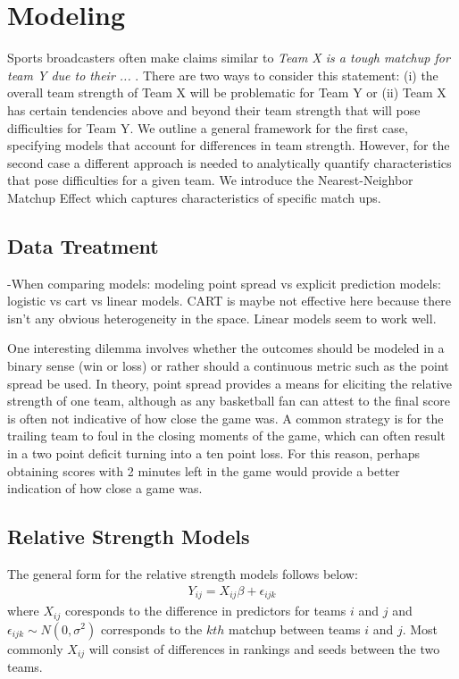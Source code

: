 \section{Modeling}
Sports broadcasters often make claims similar to \emph{Team X is a tough matchup for team Y due to their ... }.  There are two ways to consider this statement: (i) the overall team strength of Team X will be problematic for Team Y or (ii) Team X has certain tendencies above and beyond their team strength that will pose difficulties for Team Y.  We outline a general framework for the first case, specifying models that account for differences in team strength.  However, for the second case a different approach is needed to analytically quantify characteristics that pose difficulties for a given team.  We introduce the Nearest-Neighbor Matchup Effect which captures characteristics of specific match ups.  

\subsection{Data Treatment}

-When comparing models: modeling point spread vs explicit prediction models: logistic vs cart vs linear models.
CART is maybe not effective here because there isn't any obvious heterogeneity in the space. Linear models seem to work well.

One interesting dilemma involves whether the outcomes should be modeled in a binary sense (win or loss) or rather should a continuous metric such as the point spread be used.  In theory, point spread provides a means for eliciting the relative strength of one team, although as any basketball fan can attest to the final score is often not indicative of how close the game was.  A common strategy is for the trailing team to foul in the closing moments of the game, which can often result in a two point deficit turning into a ten point loss.  For this reason, perhaps obtaining scores with 2 minutes left in the game would provide a better indication of how close a game was.

\subsection{Relative Strength Models}
The general form for the relative strength models follows below:
\begin{eqnarray}
Y_{ij} = X_{ij} \beta + \epsilon_{ijk}
\label{eq:RS}
\end{eqnarray}
where $X_{ij}$ coresponds to the difference in predictors for teams $i$ and $j$ and $\epsilon_{ijk} \sim N(0,\sigma^2)$ corresponds to the $kth$ matchup between teams $i$ and $j$.  Most commonly $X_{ij}$ will consist of differences in rankings and seeds between the two teams.

